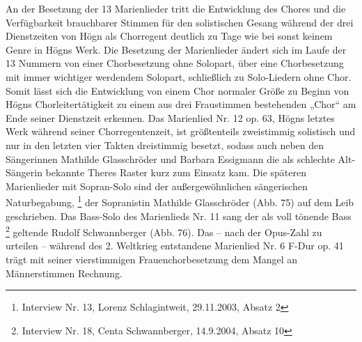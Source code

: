 An der Besetzung der 13 Marienlieder tritt die Entwicklung des Chores
und die Verfügbarkeit brauchbarer Stimmen für den solistischen Gesang
während der drei Dienstzeiten von Högn als Chorregent deutlich zu Tage
wie bei sonst keinem Genre in Högns Werk. Die Besetzung der
Marienlieder ändert sich im Laufe der 13 Nummern von einer
Chorbesetzung ohne Solopart, über eine Chorbesetzung mit immer
wichtiger werdendem Solopart, schließlich zu Solo-Liedern ohne Chor.
Somit lässt sich die Entwicklung von einem Chor normaler Größe zu
Beginn von Högns Chorleitertätigkeit zu einem aus drei Fraustimmen
bestehenden „Chor“ am Ende seiner Dienstzeit erkennen. Das Marienlied
Nr. 12 op. 63, Högns letztes Werk während seiner Chorregentenzeit, ist
größtenteils zweistimmig solistisch und nur in den letzten vier Takten
dreistimmig besetzt, sodass auch neben den Sängerinnen Mathilde
Glasschröder und Barbara Essigmann die als schlechte Alt-Sängerin
bekannte Theres Raster kurz zum Einsatz kam. Die späteren Marienlieder
mit Sopran-Solo sind der außergewöhnlichen sängerischen
Naturbegabung, \footnote{Interview Nr. 13, Lorenz Schlagintweit,
29.11.2003, Absatz 2} der Sopranistin Mathilde Glasschröder (Abb. 75)
auf dem Leib geschrieben. Das Bass-Solo des Marienlieds Nr. 11 sang der
als voll tönende Bass \footnote{Interview Nr. 18, Centa Schwannberger,
14.9.2004, Absatz 10} geltende Rudolf Schwannberger (Abb. 76). Das –
nach der Opus-Zahl zu urteilen – während des 2. Weltkrieg entstandene
Marienlied Nr. 6 F-Dur op. 41 trägt mit seiner vierstimmigen
Frauenchorbesetzung dem Mangel an Männerstimmen Rechnung.

